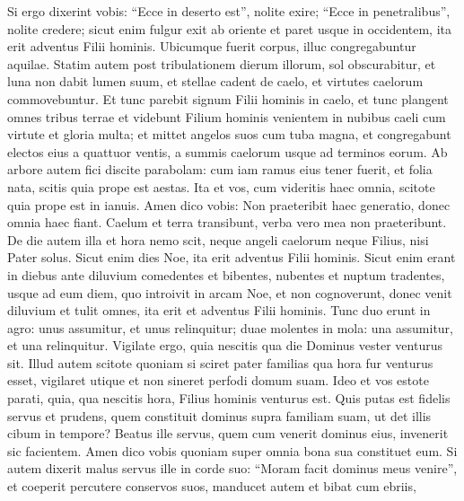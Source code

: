 \begin{biblechapter}
\begin{biblechapter}
\begin{biblechapter}
\begin{biblechapter}
\begin{biblechapter}
\begin{biblechapter}
\begin{biblechapter}
\begin{biblechapter}
\begin{biblechapter}
\begin{biblechapter}
\begin{biblechapter}
\begin{biblechapter}
\begin{biblechapter}
\begin{biblechapter}
\begin{biblechapter}
\begin{biblechapter}
\begin{biblechapter}
\begin{biblechapter}
\begin{biblechapter}
\begin{biblechapter}
\begin{biblechapter}
\begin{biblechapter}
\begin{biblechapter}
\begin{biblechapter}
\verse Si ergo dixerint vobis: “Ecce in deserto est”, nolite exire; “Ecce in penetralibus”, nolite credere; 
\verse sicut enim fulgur exit ab oriente et paret usque in occidentem, ita erit adventus Filii hominis. 
\verse Ubicumque fuerit corpus, illuc congregabuntur aquilae.
 \verse Statim autem post tribulationem dierum illorum, sol obscurabitur, et luna non dabit lumen suum, et stellae cadent de caelo, et virtutes caelorum commovebuntur. 
\verse Et tunc parebit signum Filii hominis in caelo, et tunc plangent omnes tribus terrae et videbunt Filium hominis venientem in nubibus caeli cum virtute et gloria multa; 
\verse et mittet angelos suos cum tuba magna, et congregabunt electos eius a quattuor ventis, a summis caelorum usque ad terminos eorum.
 \verse Ab arbore autem fici discite parabolam: cum iam ramus eius tener fuerit, et folia nata, scitis quia prope est aestas. 
\verse Ita et vos, cum videritis haec omnia, scitote quia prope est in ianuis. 
\verse Amen dico vobis: Non praeteribit haec generatio, donec omnia haec fiant. 
\verse Caelum et terra transibunt, verba vero mea non praeteribunt.
 \verse De die autem illa et hora nemo scit, neque angeli caelorum neque Filius, nisi Pater solus. 
\verse Sicut enim dies Noe, ita erit adventus Filii hominis. 
\verse Sicut enim erant in diebus ante diluvium comedentes et bibentes, nubentes et nuptum tradentes, usque ad eum diem, quo introivit in arcam Noe, 
\verse et non cognoverunt, donec venit diluvium et tulit omnes, ita erit et adventus Filii hominis. 
\verse Tunc duo erunt in agro: unus assumitur, et unus relinquitur; 
 \verse duae molentes in mola: una assumitur, et una relinquitur.
 \verse Vigilate ergo, quia nescitis qua die Dominus vester venturus sit. 
\verse Illud autem scitote quoniam si sciret pater familias qua hora fur venturus esset, vigilaret utique et non sineret perfodi domum suam. 
\verse Ideo et vos estote parati, quia, qua nescitis hora, Filius hominis venturus est. 
\verse Quis putas est fidelis servus et prudens, quem constituit dominus supra familiam suam, ut det illis cibum in tempore? 
\verse Beatus ille servus, quem cum venerit dominus eius, invenerit sic facientem. 
\verse Amen dico vobis quoniam super omnia bona sua constituet eum. 
\verse Si autem dixerit malus servus ille in corde suo: “Moram facit dominus meus venire”, 
\verse et coeperit percutere conservos suos, manducet autem et bibat cum ebriis, 

\end{biblechapter}
\end{biblechapter}
\end{biblechapter}
\end{biblechapter}
\end{biblechapter}
\end{biblechapter}
\end{biblechapter}
\end{biblechapter}
\end{biblechapter}
\end{biblechapter}
\end{biblechapter}
\end{biblechapter}
\end{biblechapter}
\end{biblechapter}
\end{biblechapter}
\end{biblechapter}
\end{biblechapter}
\end{biblechapter}
\end{biblechapter}
\end{biblechapter}
\end{biblechapter}
\end{biblechapter}
\end{biblechapter}
\end{biblechapter}
